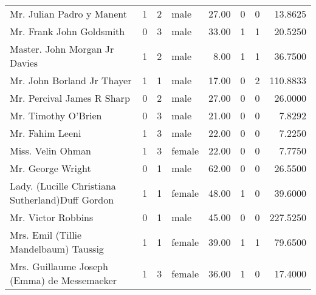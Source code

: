 \begin{tabular}{lrrlrrrr}
Mr. Julian Padro y Manent                          &         1 &       2 &    male &  27.00 &                        0 &                        0 &   13.8625 \\
Mr. Frank John Goldsmith                           &         0 &       3 &    male &  33.00 &                        1 &                        1 &   20.5250 \\
Master. John Morgan Jr Davies                      &         1 &       2 &    male &   8.00 &                        1 &                        1 &   36.7500 \\
Mr. John Borland Jr Thayer                         &         1 &       1 &    male &  17.00 &                        0 &                        2 &  110.8833 \\
Mr. Percival James R Sharp                         &         0 &       2 &    male &  27.00 &                        0 &                        0 &   26.0000 \\
Mr. Timothy O'Brien                                &         0 &       3 &    male &  21.00 &                        0 &                        0 &    7.8292 \\
Mr. Fahim Leeni                                    &         1 &       3 &    male &  22.00 &                        0 &                        0 &    7.2250 \\
Miss. Velin Ohman                                  &         1 &       3 &  female &  22.00 &                        0 &                        0 &    7.7750 \\
Mr. George Wright                                  &         0 &       1 &    male &  62.00 &                        0 &                        0 &   26.5500 \\
Lady. (Lucille Christiana Sutherland)Duff Gordon   &         1 &       1 &  female &  48.00 &                        1 &                        0 &   39.6000 \\
Mr. Victor Robbins                                 &         0 &       1 &    male &  45.00 &                        0 &                        0 &  227.5250 \\
Mrs. Emil (Tillie Mandelbaum) Taussig              &         1 &       1 &  female &  39.00 &                        1 &                        1 &   79.6500 \\
Mrs. Guillaume Joseph (Emma) de Messemaeker        &         1 &       3 &  female &  36.00 &                        1 &                        0 &   17.4000 \\

\end{tabular}
